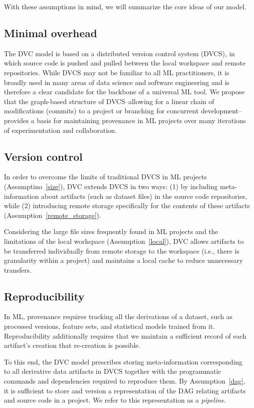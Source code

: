 \documentclass[10pt,sigconf, authordraft]{acmart}
\begin{document}
With these assumptions in mind, we will summarize the core ideas of our model. 

\subsection{Minimal overhead}
The DVC model is based on a distributed version control system (DVCS), in which source code is pushed and pulled between the local workspace and remote repositories. While DVCS may not be familiar to all ML practitioners, it is broadly used in many areas of data science and software engineering and is therefore a clear candidate for the backbone of a universal ML tool. We propose that the graph-based structure of DVCS--allowing for a linear chain of modifications (commits) to a project or branching for concurrent development--provides a basis for maintaining provenance in ML projects over many iterations of experimentation and collaboration. 

\subsection{Version control}\label{dataindependence} 
In order to overcome the limits of traditional DVCS in ML projects (Assumptino~\ref{size}), DVC extends DVCS in two ways: (1) by including meta-information about artifacts (such as dataset files) in the source code repositories, while (2) introducing remote storage specifically for the contents of these artifacts (Assumption~\ref{remote_storage}). 

Considering the large file sizes frequently found in ML projects and the limitations of the local workspace (Assumption~\ref{local}), DVC allows artifacts to be transferred individually from remote storage to the workspace (i.e., there is granularity within a project) and maintains a local cache to reduce unnecessary transfers. 

\subsection{Reproducibility}
In ML, provenance requires tracking all the derivations of a dataset, such as processed versions, feature sets, and statistical models trained from it. Reproducibility additionally requires that we maintain a sufficient record of each artifact's creation that re-creation is possible. 

To this end, the DVC model prescribes storing meta-information corresponding to all derivative data artifacts in DVCS together with the programmatic commands and dependencies required to reproduce them. By Assumption~\ref{dag}, it is sufficient to store and version a representation of the DAG relating artifacts and source code in a project. We refer to this representation as a \textit{pipeline}.
\end{document}
